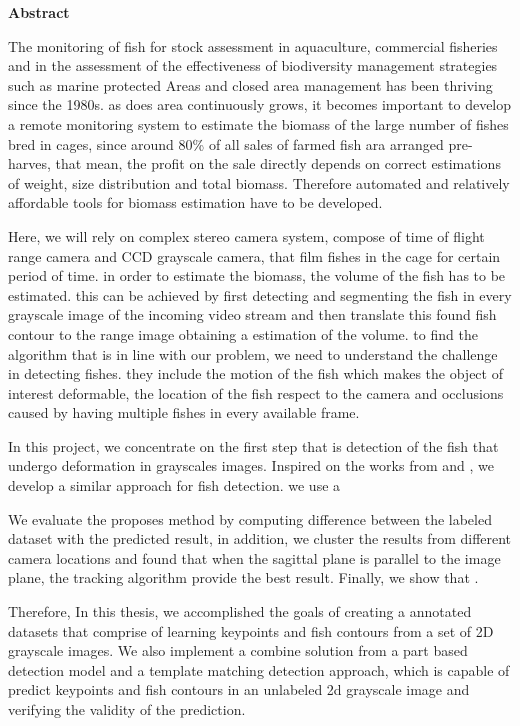 

\clearemptydoublepage
{}
{}	





\vspace*{2cm}
\begin{center}
{\Large \bf Abstract}
\end{center}
\vspace{1cm}

The monitoring of fish for stock assessment in aquaculture, commercial fisheries 
and in the assessment of the effectiveness of biodiversity management strategies 
such as marine protected Areas and closed area management has been thriving since the 1980s.
as does area continuously grows, it becomes important to develop a remote monitoring 
system to estimate the biomass of the large number of fishes bred in cages,
since around 80\% of all sales of farmed fish ara arranged pre-harves,
that mean, the profit on the sale directly depends on correct estimations of weight,
size distribution and total biomass.
Therefore automated and relatively affordable tools for biomass estimation have to be developed.

Here, we will rely on complex stereo camera system,
compose of time of flight range camera and CCD grayscale camera,
that film fishes in the cage for certain period of time.
in order to estimate the biomass, the volume of the fish has to be estimated. 
this can be achieved by first detecting and segmenting the fish in every grayscale 
image of the incoming video stream and then translate this found fish contour  
to the range image obtaining a estimation of the volume.
to find the algorithm that is in line with our problem,
we need to understand the challenge in detecting fishes.
they include the motion of the fish which makes the object of interest deformable,
the location of the fish respect to the camera and occlusions caused by having 
multiple fishes in every available frame.

In this project, we concentrate on the first step that is detection of the fish 
that undergo deformation in grayscales images. Inspired on the works from 
\citet{Ramanan2012} and \citet{Hinterstoisser2012}, 
we develop a similar approach for fish detection. we use a 

We evaluate the proposes method by computing difference between the labeled dataset
with the predicted result, in addition, we cluster the results from different 
camera locations and found that when the sagittal plane is parallel to the image plane,
the tracking algorithm provide the best result.
Finally, we show that .

Therefore, In this thesis, we accomplished  the goals of creating a annotated datasets that
comprise of learning keypoints and fish contours from a set of 2D grayscale images.
We also implement a combine solution from a part based detection model and a template
matching detection approach, which is capable of predict keypoints and fish contours in an 
unlabeled 2d grayscale image and verifying the validity of the prediction.
